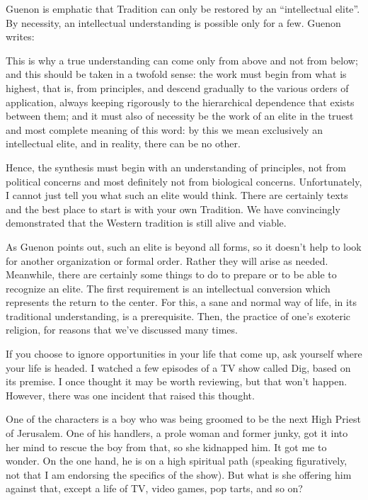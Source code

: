 Guenon is emphatic that Tradition can only be restored by an ``intellectual elite''. By necessity, an intellectual understanding is possible only for a few. Guenon writes:

\begin{quotex}
This is why a true understanding can come only from above and not from below; and this should be taken in a twofold sense: the work must begin from what is highest, that is, from principles, and descend gradually to the various orders of application, always keeping rigorously to the hierarchical dependence that exists between them; and it must also of necessity be the work of an elite in the truest and most complete meaning of this word: by this we mean exclusively an intellectual elite, and in reality, there can be no other.
\end{quotex}


Hence, the synthesis must begin with an understanding of principles, not from political concerns and most definitely not from biological concerns. Unfortunately, I cannot just tell you what such an elite would think. There are certainly texts and the best place to start is with your own Tradition. We have convincingly demonstrated that the Western tradition is still alive and viable.

As Guenon points out, such an elite is beyond all forms, so it doesn't help to look for another organization or formal order. Rather they will arise as needed. Meanwhile, there are certainly some things to do to prepare or to be able to recognize an elite. The first requirement is an intellectual conversion which represents the return to the center. For this, a sane and normal way of life, in its traditional understanding, is a prerequisite. Then, the practice of one's exoteric religion, for reasons that we've discussed many times.

If you choose to ignore opportunities in your life that come up, ask yourself where your life is headed. I watched a few episodes of a TV show called Dig, based on its premise. I once thought it may be worth reviewing, but that won't happen. However, there was one incident that raised this thought.

One of the characters is a boy who was being groomed to be the next High Priest of Jerusalem. One of his handlers, a prole woman and former junky, got it into her mind to rescue the boy from that, so she kidnapped him. It got me to wonder. On the one hand, he is on a high spiritual path (speaking figuratively, not that I am endorsing the specifics of the show). But what is she offering him against that, except a life of TV, video games, pop tarts, and so on?

